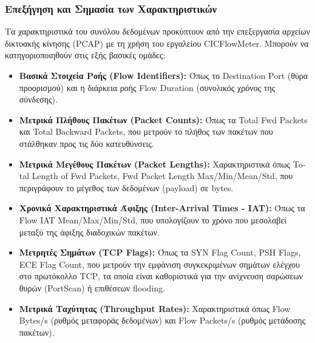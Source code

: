 \documentclass[11pt,a4paper]{article}
\newcommand{\eng}[1]{\textlatin{#1}}
\begin{document}
\subsubsection{Επεξήγηση και Σημασία των Χαρακτηριστικών}
Τα χαρακτηριστικά του συνόλου δεδομένων προκύπτουν από την επεξεργασία αρχείων δικτυακής κίνησης (\eng{PCAP}) με τη χρήση του εργαλείου \eng{CICFlowMeter}. Μπορούν να κατηγοριοποιηθούν στις εξής βασικές ομάδες:
\begin{itemize}
    \item \textbf{Βασικά Στοιχεία Ροής (\eng{Flow Identifiers}):} Όπως το \eng{Destination Port} (θύρα προορισμού) και η διάρκεια ροής \eng{Flow Duration} (συνολικός χρόνος της σύνδεσης).
    \item \textbf{Μετρικά Πλήθους Πακέτων (\eng{Packet Counts}):} Όπως τα \eng{Total Fwd Packets} και \eng{Total Backward Packets}, που μετρούν το πλήθος των πακέτων που στάλθηκαν προς τις δύο κατευθύνσεις.
    \item \textbf{Μετρικά Μεγέθους Πακέτων (\eng{Packet Lengths}):} Χαρακτηριστικά όπως \eng{Total Length of Fwd Packets}, \eng{Fwd Packet Length Max/Min/Mean/Std}, που περιγράφουν το μέγεθος των δεδομένων (\eng{payload}) σε \eng{bytes}.
    \item \textbf{Χρονικά Χαρακτηριστικά Άφιξης (\eng{Inter-Arrival Times - IAT}):} Όπως τα \eng{Flow IAT Mean/Max/Min/Std}, που υπολογίζουν το χρόνο που μεσολαβεί μεταξύ της άφιξης διαδοχικών πακέτων.
    \item \textbf{Μετρητές Σημάτων (\eng{TCP Flags}):} Όπως τα \eng{SYN Flag Count}, \eng{PSH Flags}, \eng{ECE Flag Count}, που μετρούν την εμφάνιση συγκεκριμένων σημάτων ελέγχου στο πρωτόκολλο \eng{TCP}, τα οποία είναι καθοριστικά για την ανίχνευση σαρώσεων θυρών (\eng{PortScan}) ή επιθέσεων \eng{flooding}.
    \item \textbf{Μετρικά Ταχύτητας (\eng{Throughput Rates}):} Χαρακτηριστικά όπως \eng{Flow Bytes/s} (ρυθμός μεταφοράς δεδομένων) και \eng{Flow Packets/s} (ρυθμός μετάδοσης πακέτων).
\end{itemize}
\end{document}

